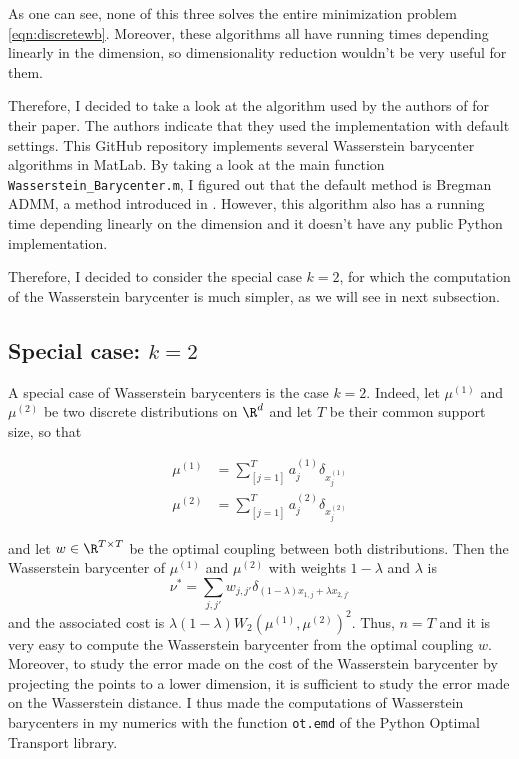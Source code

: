 \documentclass[11pt,a4paper]{article}
\begin{document}
As one can see, none of this three solves the entire minimization problem \ref{eqn:discretewb}. Moreover, these algorithms all have running times depending linearly in the dimension, so dimensionality reduction wouldn't be very useful for them.

Therefore, I decided to take a look at the algorithm used by the authors of \cite{izzo_dimensionality_2021} for their paper. The authors indicate that they used the implementation \cite{ye_efficient_2022} with default settings. This GitHub repository implements several Wasserstein barycenter algorithms in MatLab. By taking a look at the main function \verb|Wasserstein_Barycenter.m|, I figured out that the default method is Bregman ADMM, a method introduced in \cite{ye_fast_2017}. However, this algorithm also has a running time depending linearly on the dimension and it doesn't have any public Python implementation.

Therefore, I decided to consider the special case $k=2$, for which the computation of the Wasserstein barycenter is much simpler, as we will see in next subsection.

\subsection{Special case: $k=2$}
A special case of Wasserstein barycenters is the case $k=2$. Indeed, let $\mu^{(1)}$ and $\mu^{(2)}$ be two discrete distributions on $\R^d$ and let $T$ be their common support size, so that

\begin{align*}
    \mu^{(1)} &= \sum_[j=1]^T a^{(1)}_j \delta_{x^{(1)}_j} \\
    \mu^{(2)} &= \sum_[j=1]^T a^{(2)}_j \delta_{x^{(2)}_j}
\end{align*}

and let $w\in\R^{T\times T}$ be the optimal coupling between both distributions.
Then the Wasserstein barycenter of $\mu^{(1)}$ and $\mu^{(2)}$ with weights $1 - \lambda$ and $\lambda$ is
$$\nu^* = \sum_{j,j'} w_{j, j'} \delta_{(1-\lambda)x_{1,j} + \lambda x_{2, j'}}$$
and the associated cost is $\lambda(1 - \lambda) W_2(\mu^{(1)}, \mu^{(2)})^2$. Thus, $n=T$ and it is very easy to compute the Wasserstein barycenter from the optimal coupling $w$. Moreover, to study the error made on the cost of the Wasserstein barycenter by projecting the points to a lower dimension, it is sufficient to study the error made on the Wasserstein distance.
I thus made the computations of Wasserstein barycenters in my numerics with the function \verb|ot.emd| of the Python Optimal Transport library.
\end{document}
